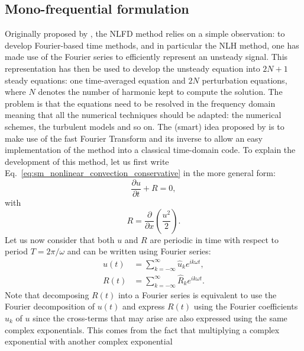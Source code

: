 
\subsection{Mono-frequential formulation}

Originally proposed by \citet{McMullen2001}, the NLFD
method relies on a simple observation: 
to develop Fourier-based time methods, and in
particular the NLH method, one has made use of the Fourier
series to efficiently represent an unsteady signal.
This representation has then be used to develop the unsteady
equation into $2N+1$ steady equations: one time-averaged equation
and $2N$ perturbation equations, 
where $N$ denotes the number
of harmonic kept to compute the solution.
The problem is that the equations need to be 
resolved in the frequency domain meaning
that all the numerical techniques should be adapted: the numerical schemes,
the turbulent models and so on. The (smart) idea 
proposed by \citet{McMullen2001} is to
make use of the fast Fourier Transform and its inverse to
allow an easy implementation of the method into a classical time-domain code.
To explain the development of this method, let us first 
write Eq.~\eqref{eq:sm_nonlinear_convection_conservative} 
in the more general form:
\begin{equation}
	\frac{\partial u}{\partial t} + R = 0,
	\label{eq:sm_nonlinear_convection_residual}
\end{equation}
with
\begin{equation}
	R = \frac{\partial}{\partial x} \left( 
	\frac{u^2}{2} \right).
\end{equation}
Let us now consider that both $u$ and $R$ are periodic
in time with respect to period $T = 2 \pi / \omega$
and can be written using Fourier series:
\begin{equation}
	\begin{split}
		u(t) &= \sum_{k=-\infty}^{\infty} \widehat{u}_k e^{i k \omega t}, \\
		R(t) &= \sum_{k=-\infty}^{\infty} \widehat{R}_k e^{i k \omega t}.
	\end{split}
\end{equation}
Note that decomposing $R(t)$ into a Fourier series is equivalent
to use the Fourier decomposition of $u(t)$ and express
$R(t)$ using the Fourier coefficients $\widehat{u}_k$ of $u$
since the cross-terms that may arise are also expressed 
using the same complex exponentials. This comes from the fact
that multiplying a complex exponential with another complex exponential
